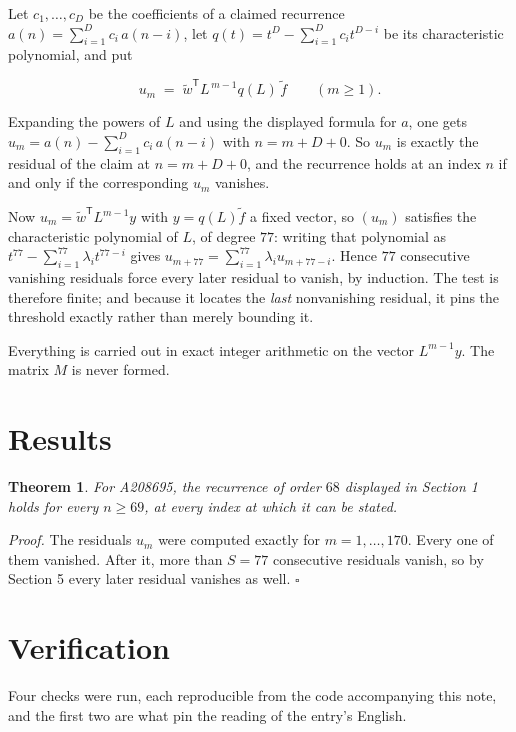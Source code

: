 \documentclass[11pt]{article}
\newtheorem{theorem}{Theorem}
\theoremstyle{definition}
\begin{document}
Let $c_1,\dots,c_D$ be the coefficients of a claimed recurrence $a(n) = \sum_{i=1}^{D} c_i\,a(n-i)$, let $q(t) = t^{D} - \sum_{i=1}^{D} c_i t^{D-i}$ be its characteristic polynomial, and put

\[u_m \;=\; \tilde w^{\mathsf T} L^{\,m-1} q(L)\,\tilde f \qquad (m \ge 1).\]

Expanding the powers of $L$ and using the displayed formula for $a$, one gets $u_m = a(n) - \sum_{i=1}^{D} c_i\,a(n-i)$ with $n = m + D + 0$. So $u_m$ is exactly the residual of the claim at $n = m + D + 0$, and the recurrence holds at an index $n$ if and only if the corresponding $u_m$ vanishes.

Now $u_m = \tilde w^{\mathsf T} L^{m-1} y$ with $y = q(L)\tilde f$ a fixed vector, so $(u_m)$ satisfies the characteristic polynomial of $L$, of degree $77$: writing that polynomial as $t^{77} - \sum_{i=1}^{77} \lambda_i t^{77-i}$ gives $u_{m+77} = \sum_{i=1}^{77} \lambda_i u_{m+77-i}$. Hence $77$ consecutive vanishing residuals force every later residual to vanish, by induction. The test is therefore finite; and because it locates the {\itshape last} nonvanishing residual, it pins the threshold exactly rather than merely bounding it.

Everything is carried out in exact integer arithmetic on the vector $L^{m-1}y$. The matrix $M$ is never formed.

\section{Results}

\begin{theorem} For A208695, the recurrence of order $68$ displayed in Section 1 holds for every $n \ge 69$, at every index at which it can be stated.\end{theorem}

{\itshape Proof.} The residuals $u_m$ were computed exactly for $m = 1,\dots,170$. Every one of them vanished. After it, more than $S = 77$ consecutive residuals vanish, so by Section 5 every later residual vanishes as well. $\square$

\section{Verification}

Four checks were run, each reproducible from the code accompanying this note, and the first two are what pin the reading of the entry's English.
\end{document}
